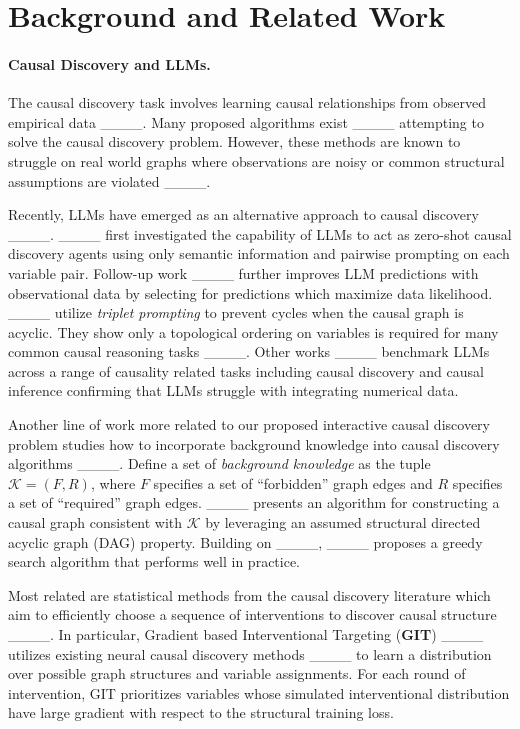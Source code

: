 \section{Background and Related Work}
\paragraph{Causal Discovery and LLMs.} The causal discovery task involves learning causal relationships from observed empirical data ____. Many proposed algorithms exist ____ attempting to solve the causal discovery problem. However, these methods are known to struggle on real world graphs where observations are noisy or common structural assumptions are violated ____. 

Recently, LLMs have emerged as an alternative approach to causal discovery ____. ____ first investigated the capability of LLMs to act as zero-shot causal discovery agents using only semantic information and pairwise prompting on each variable pair. Follow-up work ____ further improves LLM predictions with observational data by selecting for predictions which maximize data likelihood. ____ utilize \textit{triplet prompting} to prevent cycles when the causal graph is acyclic. They show only a topological ordering on variables is required for many common causal reasoning tasks ____. Other works ____ benchmark LLMs across a range of causality related tasks including causal discovery and causal inference confirming that LLMs struggle with integrating numerical data. 

Another line of work more related to our proposed interactive causal discovery problem  studies how to incorporate background knowledge into causal discovery algorithms ____. Define a set of \textit{background knowledge} as the tuple $\mathcal{K} = (F,R)$, where $F$ specifies a set of ``forbidden'' graph edges and $R$ specifies a set of ``required'' graph edges. ____ presents an algorithm for constructing a causal graph consistent with $\mathcal{K}$ by leveraging an assumed structural directed acyclic graph (DAG) property. Building on ____, ____ proposes a greedy search algorithm that performs well in practice.

Most related are statistical methods from the causal discovery literature which aim to efficiently choose a sequence of interventions to discover causal structure ____. In particular, Gradient based Interventional Targeting (\textbf{GIT}) ____ utilizes existing neural causal discovery methods ____ to learn a distribution over possible graph structures and variable assignments. For each round of intervention, GIT prioritizes variables whose simulated interventional distribution have large gradient with respect to the structural training loss.

